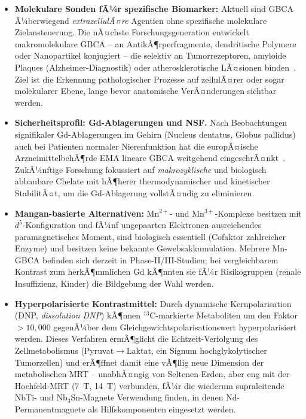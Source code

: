 ﻿\documentclass[12pt, a4paper]{report}
\theoremstyle{definition}
\theoremstyle{remark}
\begin{document}
\begin{itemize}
  \item \textbf{Molekulare Sonden fÃ¼r spezifische Biomarker:} Aktuell sind
    GBCA Ã¼berwiegend \emph{extrazellulÃ¤re} Agentien ohne spezifische
    molekulare Zielansteuerung. Die nÃ¤chste Forschungsgeneration entwickelt
    makromolekulare GBCA -- an AntikÃ¶rperfragmente, dendritische Polymere
    oder Nanopartikel konjugiert -- die selektiv an Tumorrezeptoren,
    amyloide Plaques (Alzheimer-Diagnostik) oder atherosklerotische
    LÃ¤sionen binden~\cite{caravan1999}. Ziel ist die Erkennung pathologischer
    Prozesse auf zellulÃ¤rer oder sogar molekularer Ebene, lange bevor
    anatomische VerÃ¤nderungen sichtbar werden.

  \item \textbf{Sicherheitsprofil: Gd-Ablagerungen und NSF.}
    Nach Beobachtungen signifikaler Gd-Ablagerungen im Gehirn (Nucleus
    dentatus, Globus pallidus) auch bei Patienten normaler Nierenfunktion
    hat die europÃ¤ische ArzneimittelbehÃ¶rde EMA lineare GBCA weitgehend
    eingeschrÃ¤nkt~\cite{kanda2014}. ZukÃ¼nftige Forschung fokussiert auf
    \emph{makrozyklische} und biologisch abbaubare Chelate mit hÃ¶herer
    thermodynamischer und kinetischer StabilitÃ¤t, um die Gd-Ablagerung
    vollstÃ¤ndig zu eliminieren.

  \item \textbf{Mangan-basierte Alternativen:}
    Mn$^{2+}$- und Mn$^{3+}$-Komplexe besitzen mit $d^5$-Konfiguration und
    fÃ¼nf ungepaarten Elektronen ausreichendes paramagnetisches Moment, sind
    biologisch essentiell (Cofaktor zahlreicher Enzyme) und besitzen keine
    bekannte Gewebsakkumulation. Mehrere Mn-GBCA befinden sich derzeit in
    Phase-II/III-Studien; bei vergleichbarem Kontrast zum herkÃ¶mmlichen Gd
    kÃ¶nnten sie fÃ¼r Risikogruppen (renale Insuffizienz, Kinder) die Bildgebung
    der Wahl werden.

  \item \textbf{Hyperpolarisierte Kontrastmittel:}
    Durch dynamische Kernpolarisation (DNP, \emph{dissolution DNP}) kÃ¶nnen
    $^{13}$C-markierte Metaboliten um den Faktor $>10\!{,}000$ gegenÃ¼ber dem
    Gleichgewichtspolarisationswert hyperpolarisiert werden. Dieses Verfahren
    ermÃ¶glicht die Echtzeit-Verfolgung des Zellmetabolismus (Pyruvat$\to$Laktat,
    ein Signum hochglykolytischer Tumorzellen) und erÃ¶ffnet damit eine
    vÃ¶llig neue Dimension der metabolischen MRT -- unabhÃ¤ngig von Seltenen
    Erden, aber eng mit der Hochfeld-MRT (7~T, 14~T) verbunden, fÃ¼r die
    wiederum supraleitende NbTi- und Nb$_3$Sn-Magnete Verwendung finden, in
    denen Nd-Permanentmagnete als Hilfskomponenten eingesetzt werden.
\end{itemize}
\end{document}
